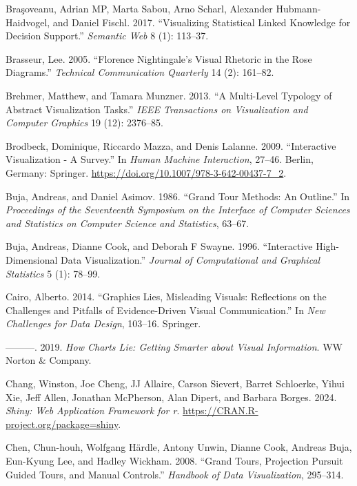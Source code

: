 \documentclass[
]{book}
\newlength{\cslhangindent}
\newenvironment{CSLReferences}[2] %
 {\begin{list}{}{%
  \setlength{\itemindent}{0pt}
  \setlength{\leftmargin}{0pt}
  \setlength{\parsep}{0pt}
  \ifodd #1
   \setlength{\leftmargin}{\cslhangindent}
   \setlength{\itemindent}{-1\cslhangindent}
  \fi
  \setlength{\itemsep}{#2\baselineskip}}}
 {\end{list}}
\begin{document}
\begin{CSLReferences}{1}{0}
Braşoveanu, Adrian MP, Marta Sabou, Arno Scharl, Alexander Hubmann-Haidvogel, and Daniel Fischl. 2017. {``Visualizing Statistical Linked Knowledge for Decision Support.''} \emph{Semantic Web} 8 (1): 113--37.

Brasseur, Lee. 2005. {``Florence Nightingale's Visual Rhetoric in the Rose Diagrams.''} \emph{Technical Communication Quarterly} 14 (2): 161--82.

Brehmer, Matthew, and Tamara Munzner. 2013. {``A Multi-Level Typology of Abstract Visualization Tasks.''} \emph{IEEE Transactions on Visualization and Computer Graphics} 19 (12): 2376--85.

Brodbeck, Dominique, Riccardo Mazza, and Denis Lalanne. 2009. {``{Interactive Visualization - A Survey}.''} In \emph{{Human Machine Interaction}}, 27--46. Berlin, Germany: Springer. \url{https://doi.org/10.1007/978-3-642-00437-7_2}.

Buja, Andreas, and Daniel Asimov. 1986. {``Grand Tour Methods: An Outline.''} In \emph{Proceedings of the Seventeenth Symposium on the Interface of Computer Sciences and Statistics on Computer Science and Statistics}, 63--67.

Buja, Andreas, Dianne Cook, and Deborah F Swayne. 1996. {``Interactive High-Dimensional Data Visualization.''} \emph{Journal of Computational and Graphical Statistics} 5 (1): 78--99.

Cairo, Alberto. 2014. {``Graphics Lies, Misleading Visuals: Reflections on the Challenges and Pitfalls of Evidence-Driven Visual Communication.''} In \emph{New Challenges for Data Design}, 103--16. Springer.

---------. 2019. \emph{How Charts Lie: Getting Smarter about Visual Information}. WW Norton \& Company.

Chang, Winston, Joe Cheng, JJ Allaire, Carson Sievert, Barret Schloerke, Yihui Xie, Jeff Allen, Jonathan McPherson, Alan Dipert, and Barbara Borges. 2024. \emph{Shiny: Web Application Framework for r}. \url{https://CRAN.R-project.org/package=shiny}.

Chen, Chun-houh, Wolfgang Härdle, Antony Unwin, Dianne Cook, Andreas Buja, Eun-Kyung Lee, and Hadley Wickham. 2008. {``Grand Tours, Projection Pursuit Guided Tours, and Manual Controls.''} \emph{Handbook of Data Visualization}, 295--314.


\end{CSLReferences}
\end{document}
